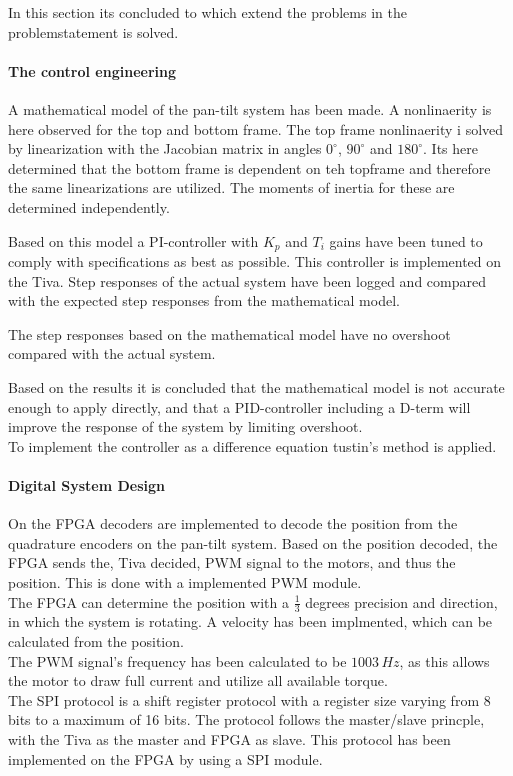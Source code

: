 \documentclass[../../main]{subfiles}
\begin{document}
In this section its concluded to which extend the problems in the problemstatement is solved.

\paragraph{The control engineering}
A mathematical model of the pan-tilt system has been made.
A nonlinaerity is here observed for the top and bottom frame. The top frame nonlinaerity i solved by linearization with the Jacobian matrix in angles $0^\circ$, $90^\circ$ and $180^\circ$. Its here determined that the bottom frame is dependent on teh topframe and therefore the same linearizations are utilized. The moments of inertia for these are determined independently.

Based on this model a PI-controller with $K_p$ and $T_i$ gains have been tuned to comply with specifications as best as possible. This controller is implemented on the Tiva.
Step responses of the actual system have been logged and compared with the expected step responses from the mathematical model.

The step responses based on the mathematical model have no overshoot compared with the actual system.

Based on the results it is concluded that the mathematical model is not accurate enough to apply directly, and that a PID-controller including a D-term will improve the response of the system by limiting overshoot.\\
To implement the controller as a difference equation tustin's method is applied.

\paragraph{Digital System Design}
On the FPGA decoders are implemented to decode the position from the quadrature encoders on the pan-tilt system. Based on the position decoded, the FPGA sends the, Tiva decided, PWM signal to the motors, and thus the position. This is done with a implemented PWM module.\\
The FPGA can determine the position with a $\frac{1}{3}$ degrees precision and direction, in which the system is rotating. A velocity has been implmented, which can be calculated from the position.\\
The PWM signal's frequency has been calculated to be $1003 \si{\,Hz}$, as this allows the motor to draw full current and utilize all available torque. \\
The SPI protocol is a shift register protocol with a register size varying from 8 bits to a maximum of 16 bits. The protocol follows the master/slave princple, with the Tiva as the master and FPGA as slave. This protocol has been implemented on the FPGA by using a SPI module.
\end{document}
